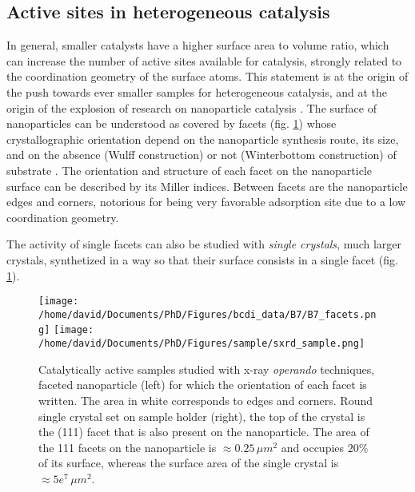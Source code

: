 \subsection{Active sites in heterogeneous catalysis}

In general, smaller catalysts have a higher surface area to volume ratio, which can increase the number of active sites available for catalysis, strongly related to the coordination geometry of the surface atoms.
This statement is at the origin of the push towards ever smaller samples for heterogeneous catalysis, and at the origin of the explosion of research on nanoparticle catalysis \parencite{Molenbroek2009, Schauermann2013}.
The surface of nanoparticles can be understood as covered by facets (fig. \ref{fig:Samples}) whose crystallographic orientation depend on the nanoparticle synthesis route, its size, and on the absence (Wulff construction) or not (Winterbottom construction) of substrate \parencite{Boukouvala2021}.
The orientation and structure of each facet on the nanoparticle surface can be described by its Miller indices.
Between facets are the nanoparticle edges and corners, notorious for being very favorable adsorption site \parencite{Vogt2022} due to a low coordination geometry.

The activity of single facets can also be studied with \textit{single crystals}, much larger crystals, synthetized in a way so that their surface consists in a single facet (fig. \ref{fig:Samples}).

\begin{figure}[!htb]
    \centering
    \texttt{[image: /home/david/Documents/PhD/Figures/bcdi\_data/B7/B7\_facets.png]}
    \texttt{[image: /home/david/Documents/PhD/Figures/sample/sxrd\_sample.png]}
    \caption{
        Catalytically active samples studied with x-ray \textit{operando} techniques, faceted nanoparticle (left) for which the orientation of each facet is written.
        The area in white corresponds to edges and corners.
        Round single crystal set on sample holder (right), the top of the crystal is the (111) facet that is also present on the nanoparticle.
        The area of the {111} facets on the nanoparticle is $\approx 0.25 \, \mu m^2$ and occupies $20 \%$ of its surface, whereas the surface area of the single crystal is $\approx 5e^7 \, \mu m^2$.
    }
    \label{fig:Samples}
\end{figure}
